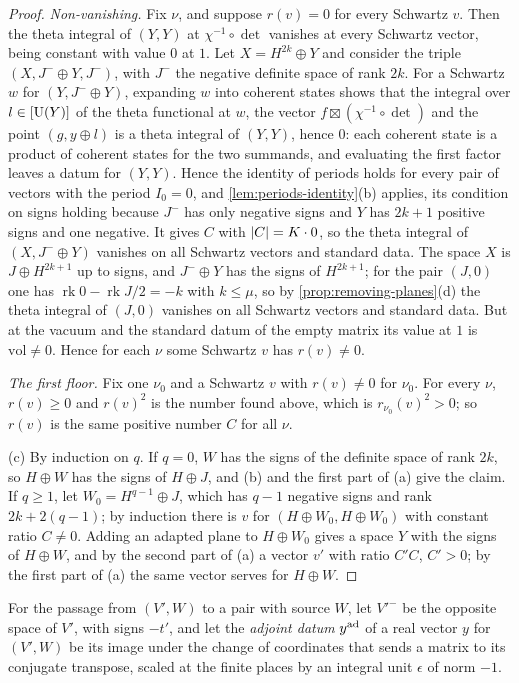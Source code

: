 \begin{proof}
\emph{Non-vanishing.} Fix $\nu$, and suppose $r(v)=0$ for every Schwartz $v$. Then the theta integral of $(Y,Y)$ at $\chi^{-1}\circ\det$ vanishes at every Schwartz vector, being constant with value $0$ at $1$.
Let $X=H^{2k}\oplus Y$ and consider the triple $(X,J^-\oplus Y,J^-)$, with $J^-$ the negative definite space of rank $2k$. For a Schwartz $w$ for $(Y,J^-\oplus Y)$, expanding $w$ into coherent states shows that the
integral over $l\in[\operatorname{U}(Y)]$ of the theta functional at $w$, the vector $f\boxtimes(\chi^{-1}\circ\det)$ and the point $(g,y\oplus l)$ is a theta integral of $(Y,Y)$, hence $0$: each coherent state is a product of
coherent states for the two summands, and evaluating the first factor leaves a datum for $(Y,Y)$. Hence the identity of periods holds for every pair of vectors with the period $I_0=0$, and
\cref{lem:periods-identity}(b) applies, its condition on signs holding because $J^-$ has only negative signs and $Y$ has $2k+1$ positive signs and one negative. It gives $C$ with $\lvert C\rvert=K\cdot0$, so the
theta integral of $(X,J^-\oplus Y)$ vanishes on all Schwartz vectors and standard data. The space $X$ is $J\oplus H^{2k+1}$ up to signs, and $J^-\oplus Y$ has the signs of $H^{2k+1}$; for the pair $(J,0)$ one has
$\operatorname{rk}0-\operatorname{rk}J/2=-k$ with $k\le\mu$, so by \cref{prop:removing-planes}(d) the theta integral of $(J,0)$ vanishes on all Schwartz vectors and standard data. But at the vacuum and the standard
datum of the empty matrix its value at $1$ is $\mathrm{vol}\ne0$. Hence for each $\nu$ some Schwartz $v$ has $r(v)\ne0$.

\emph{The first floor.} Fix one $\nu_0$ and a Schwartz $v$ with $r(v)\ne0$ for $\nu_0$. For every $\nu$, $r(v)\ge0$ and $r(v)^2$ is the number found above, which is $r_{\nu_0}(v)^2>0$; so $r(v)$ is the same positive
number $C$ for all $\nu$.

(c) By induction on $q$. If $q=0$, $W$ has the signs of the definite space of rank $2k$, so $H\oplus W$ has the signs of $H\oplus J$, and (b) and the first part of (a) give the claim. If $q\ge1$, let
$W_0=H^{q-1}\oplus J$, which has $q-1$ negative signs and rank $2k+2(q-1)$; by induction there is $v$ for $(H\oplus W_0,H\oplus W_0)$ with constant ratio $C\ne0$. Adding an adapted plane to $H\oplus W_0$ gives a space
$Y$ with the signs of $H\oplus W$, and by the second part of (a) a vector $v'$ with ratio $C'C$, $C'>0$; by the first part of (a) the same vector serves for $H\oplus W$.
\end{proof}

For the passage from $(V',W)$ to a pair with source $W$, let $V'^-$ be the opposite space of $V'$, with signs $-t'$, and let the \emph{adjoint datum} $y^{\rm ad}$ of a real vector $y$ for $(V',W)$ be its image under the
change of coordinates that sends a matrix to its conjugate transpose, scaled at the finite places by an integral unit $\epsilon$ of norm $-1$.


